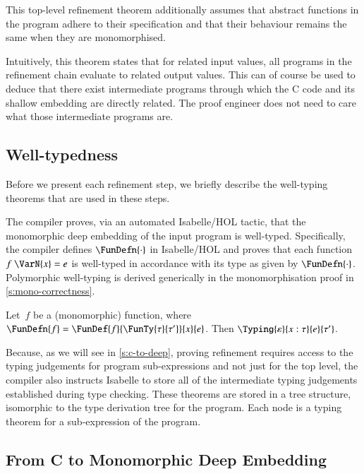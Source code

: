 \documentclass[9pt\ifFinal\else,preprint,nocopyrightspace\fi,\ifAlpha\else natbib,authoryear\fi]{sigplanconf}
\begin{document}
\noindent
This top-level refinement theorem additionally assumes that abstract functions
in the program adhere to their specification and that their behaviour
remains the same when they are monomorphised.

Intuitively, this theorem states that for related input values, all programs in the refinement chain evaluate to related output values. This can of course be used to deduce that there exist intermediate programs through which the C code and its shallow embedding are directly related. The proof engineer does not need to care what those intermediate programs are. 






\subsection{Well-typedness}\label{s:typetree}

Before we present each refinement step, we briefly describe the well-typing
theorems that are used in these steps.

The \CDSL compiler proves, via an automated Isabelle/HOL tactic, that the
monomorphic deep embedding of the input program is well-typed. Specifically,
the compiler defines $\FunDefn{\cdot}$ in Isabelle/HOL and proves that each
\CDSL function~$f\ \VarN{x} = e$ is well-typed in accordance with its type as
given by $\FunDefn{\cdot}$. Polymorphic well-typing is derived generically in
the monomorphisation proof in \autoref{s:mono-correctness}.

\begin{theorem}[Typing]
Let~$f$ be a (monomorphic) \CDSL function, where \mbox{$\FunDefn{f} = \FunDef{f}{\FunTy{\tau}{\tau'}}{x}{e}$}.
Then $\Typing{\varepsilon}{x : \tau}{e}{\tau'}$.
\end{theorem}

\noindent Because, as we will see in \autoref{s:c-to-deep}, proving
refinement requires access to the typing judgements for program
sub-expressions and not just for the top level, the \CDSL compiler also
instructs Isabelle to store all of the intermediate typing judgements
established during type checking. These theorems are stored in a tree
structure, isomorphic to the type derivation tree for the \CDSL program. Each
node is a typing theorem for a sub-expression of the program.

\subsection{From C to \CDSL Monomorphic Deep Embedding}\label{s:c-to-deep}
\end{document}

